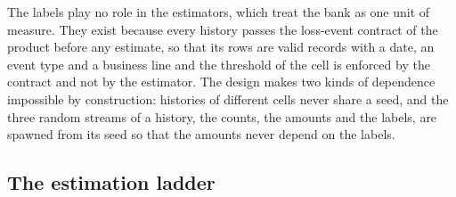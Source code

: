 The labels play no role in the estimators, which treat the bank as one unit of measure. They exist because every history passes the loss-event contract of the product before any estimate, so that its rows are valid records with a date, an event type and a business line and the threshold of the cell is enforced by the contract and not by the estimator. The design makes two kinds of dependence impossible by construction: histories of different cells never share a seed, and the three random streams of a history, the counts, the amounts and the labels, are spawned from its seed so that the amounts never depend on the labels.

\subsection{The estimation ladder}
\label{sec:pm-ladder}

